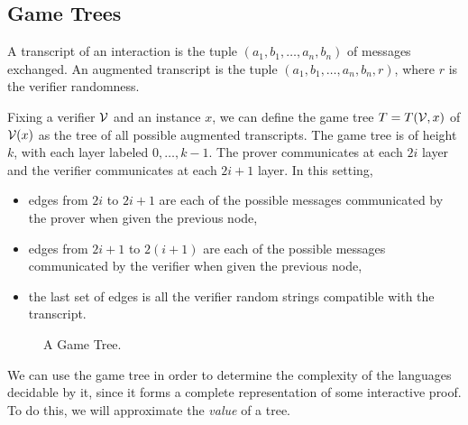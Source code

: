 \subsection{Game Trees}

\begin{definition}[Transcript]
	A transcript of an interaction is the tuple $(a_1,b_1,\dots,a_n,b_n)$ of messages exchanged. An augmented transcript is the tuple $(a_1,b_1,\dots,a_n,b_n,r)$, where $r$ is the verifier randomness.
\end{definition}

Fixing a verifier $\mathcal{V}$ and an instance $x$, we can define the game tree $T=T(\mathcal{V},x)$ of $\mathcal{V}(x)$ as the tree of all possible augmented transcripts. The game tree is of height $k$, with each layer labeled $0,\dots,k-1$. The prover communicates at each $2i$ layer and the verifier communicates at each $2i+1$ layer. In this setting,

\begin{itemize}
	\item edges from $2i$ to $2i+1$ are each of the possible messages communicated by the prover when given the previous node,
	\item edges from $2i+1$ to $2(i+1)$ are each of the possible messages communicated by the verifier when given the previous node,
	\item the last set of edges is all the verifier random strings compatible with the transcript.
\end{itemize}

\begin{figure}
	\centering
	\caption{A Game Tree.}
	\label{fig:gametree}
\end{figure}

We can use the game tree in order to determine the complexity of the languages decidable by it, since it forms a complete representation of some interactive proof. To do this, we will approximate the \textit{value} of a tree.

